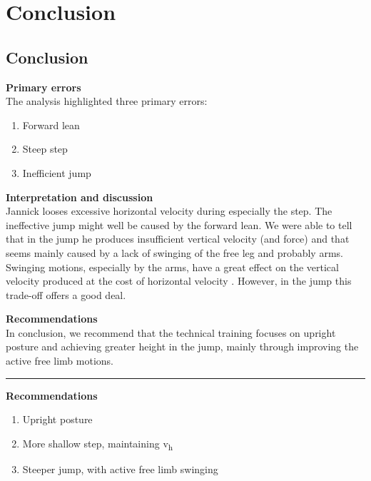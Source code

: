 \documentclass[]{scrreprt}
\providecommand{\tightlist}{%
  \setlength{\itemsep}{0pt}\setlength{\parskip}{0pt}}
\begin{document}
\hypertarget{part-conclusion}{%
\part{Conclusion}\label{part-conclusion}}

\hypertarget{conclusion}{%
\chapter{Conclusion}\label{conclusion}}

\textbf{Primary errors}\\
The analysis highlighted three primary errors:

\begin{enumerate}
\def\labelenumi{\arabic{enumi}.}
\tightlist
\item
  Forward lean
\item
  Steep step
\item
  Inefficient jump
\end{enumerate}

\textbf{Interpretation and discussion}\\
Jannick looses excessive horizontal velocity during especially the step.
The ineffective jump might well be caused by the forward lean.
We were able to tell that in the jump he produces insufficient vertical velocity (and force) and that seems mainly caused by a lack of swinging of the free leg and probably arms. Swinging motions, especially by the arms, have a great effect on the vertical velocity produced at the cost of horizontal velocity \autocite{Yu1998}. However, in the jump this trade-off offers a good deal.

\textbf{Recommendations}\\
In conclusion, we recommend that the technical training focuses on upright posture and achieving greater height in the jump, mainly through improving the active free limb motions.

\begin{center}\rule{0.5\linewidth}{0.5pt}\end{center}

\textbf{Recommendations}

\begin{enumerate}
\def\labelenumi{\arabic{enumi}.}
\tightlist
\item
  Upright posture
\item
  More shallow step, maintaining v\textsubscript{h}
\item
  Steeper jump, with active free limb swinging
\end{enumerate}
\end{document}
